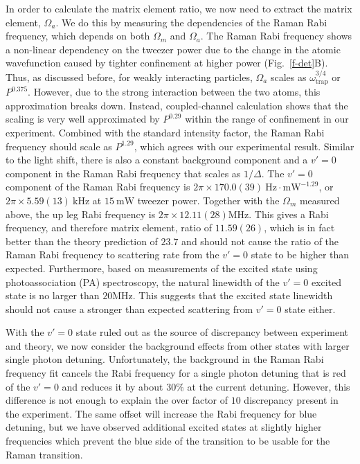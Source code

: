 \documentclass[aps,prl,twocolumn,superscriptaddress]{revtex4-1}
\begin{document}
In order to calculate the matrix element ratio,
we now need to extract the matrix element, $ \Omega_a $.
We do this by measuring the dependencies of the Raman Rabi frequency,
which depends on both $\Omega_m$ and $\Omega_a$.
The Raman Rabi frequency shows a non-linear dependency on the tweezer power
due to the change in the atomic wavefunction caused by
tighter confinement at higher power (Fig.~\ref{f-det}B).
Thus, as discussed before, for weakly interacting particles,
$\Omega_a$ scales as $ \omega_{\text{trap}}^{3/4}$ or $P^{0.375}$.
However, due to the strong interaction between the two atoms, this approximation breaks down.
Instead, coupled-channel calculation shows that the scaling
is very well approximated by $P^{0.29}$ within the range of confinement in our experiment.
Combined with the standard intensity factor, the Raman Rabi frequency should scale as $P^{1.29}$,
which agrees with our experimental result.
Similar to the light shift, there is also a constant background component
and a $v'=0$ component in the Raman Rabi frequency that scales as $1/\Delta$.
The $v'=0$ component of the Raman Rabi frequency is
$2\pi\times170.0(39) ~\mathrm{Hz\cdot mW^{-1.29}}$,
or $2\pi \times 5.59(13)~\mathrm{kHz}$ at $15 ~\mathrm{mW}$ tweezer power.
Together with the $\Omega_m$ measured above, the up leg Rabi frequency is
$2\pi \times 12.11(28)\mathrm{MHz}$.
This gives a Rabi frequency, and therefore matrix element, ratio of $11.59(26)$,
which is in fact better than the theory prediction of $23.7$
and should not cause the ratio of the Raman Rabi frequency to scattering rate
from the $v'=0$ state to be higher than expected.
Furthermore, based on measurements of the excited state using photoassociation (PA) spectroscopy,
the natural linewidth of the $v'=0$ excited state is no larger than $20 \mathrm{MHz}$.
This suggests that the excited state linewidth should not cause
a stronger than expected scattering from $v'=0$ state either.

With the $ v' = 0 $ state ruled out as the source of discrepancy between experiment and theory,
we now consider the background effects from other states with larger single photon detuning.
Unfortunately, the background in the Raman Rabi frequency fit cancels the Rabi frequency
for a single photon detuning that is red of the $ v' = 0 $
and reduces it by about $30\%$ at the current detuning.
However, this difference is not enough to explain the over factor of $10$ discrepancy
present in the experiment.
The same offset will increase the Rabi frequency for blue detuning,
but we have observed additional excited states at slightly higher frequencies
which prevent the blue side of the transition to be usable for the Raman transition.
\end{document}
